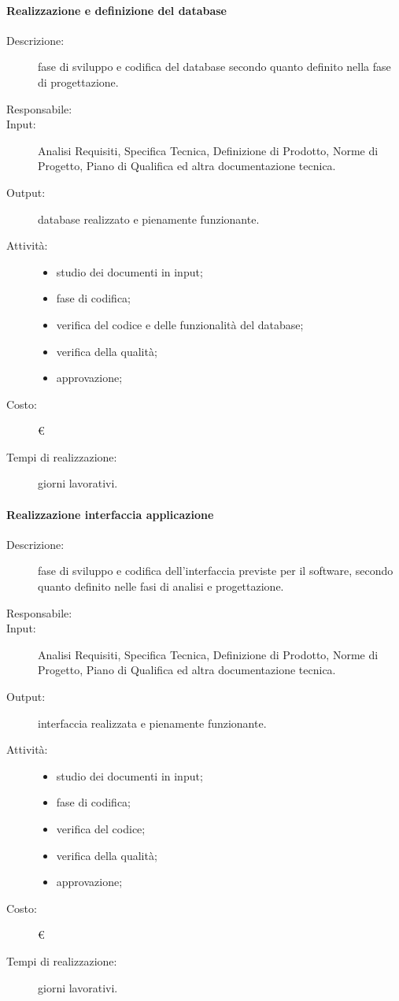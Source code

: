 \paragraph{Realizzazione e definizione del database}
\begin{description}
\item[Descrizione:] fase di sviluppo e codifica del database secondo quanto definito nella fase di progettazione.
\item[Responsabile:] 
\item[Input:] Analisi Requisiti, Specifica Tecnica, Definizione di Prodotto, Norme di Progetto, Piano di Qualifica ed altra documentazione tecnica.
\item[Output:]database realizzato e pienamente funzionante.
\item[Attività:]
\begin{itemize}
\item studio dei documenti in input;
\item fase di codifica;
\item verifica del codice e delle funzionalità del database;
\item verifica della qualità;
\item approvazione;
\end{itemize}
\item[Costo:] \euro{}
\item[Tempi di realizzazione:]  giorni lavorativi.
\end{description}

\paragraph{Realizzazione interfaccia applicazione}
\begin{description}
\item[Descrizione:] fase di sviluppo e codifica dell'interfaccia previste per il software, secondo quanto definito nelle fasi di analisi e progettazione.
\item[Responsabile:] 
\item[Input:] Analisi Requisiti, Specifica Tecnica, Definizione di Prodotto, Norme di Progetto, Piano di Qualifica ed altra documentazione tecnica.
\item[Output:] interfaccia realizzata e pienamente funzionante.
\item[Attività:]
\begin{itemize}
\item studio dei documenti in input;
\item fase di codifica;
\item verifica del codice;
\item verifica della qualità;
\item approvazione;
\end{itemize}
\item[Costo:] \euro{}
\item[Tempi di realizzazione:]  giorni lavorativi.
\end{description}

